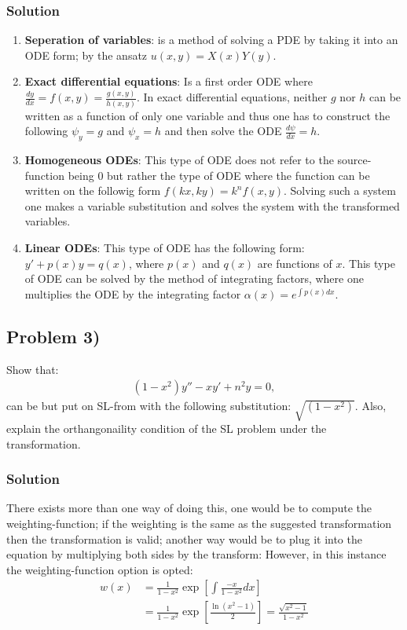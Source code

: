 \subsubsection*{Solution}
\begin{enumerate}
    \item \textbf{Seperation of variables}: is a method of solving a PDE by taking it into an ODE form; by the ansatz $u(x,y) = X(x)Y(y)$.
    \item \textbf{Exact differential equations}: Is a first order ODE where $\frac{dy}{dx} = f(x,y) = \frac{g(x,y)}{h(x,y)}$. In exact differential equations, neither $g$ nor $h$ can be written as a function of only one variable and thus one has to construct the following $\psi_y = g$ and $\psi_x = h$ and then solve the ODE $\frac{d\psi}{dx} = h$.
    \item \textbf{Homogeneous ODEs}: This type of ODE does not refer to the source-function being $0$ but rather the type of ODE where the function can be written on the followig form $f(kx,ky)=k^nf(x,y)$. Solving such a system one makes a variable substitution and solves the system with the transformed variables.
    \item \textbf{Linear ODEs}: This type of ODE has the following form: $y' + p(x)y = q(x)$, where $p(x)$ and $q(x)$ are functions of $x$. This type of ODE can be solved by the method of integrating factors, where one multiplies the ODE by the integrating factor $\alpha(x) = e^{\int p(x)dx}$.
\end{enumerate}

\subsection*{Problem 3)}
Show that:
\begin{align*}
    (1-x^2)y'' -xy' +n^2y = 0,
\end{align*}can be but put on SL-from with the following substitution: $\sqrt{(1-x^2)}$. Also, explain the orthangonaility condition of the SL problem under the transformation.

\subsubsection*{Solution}
There exists more than one way of doing this, one would be to compute the weighting-function; if the weighting is the same as the suggested transformation then the transformation is valid; another way would be to plug it into the equation by multiplying both sides by the transform:
However, in this instance the weighting-function option is opted:
\begin{align*}
    w(x) &= \frac{1}{1-x^2}\exp\left[\int \frac{-x}{1-x^2}dx\right]\\
    &= \frac{1}{1-x^2}\exp\left[\frac{\ln(x^2 -1)}{2}\right] = \frac{\sqrt{x^2 -1}}{1-x^2}\\
\end{align*}

